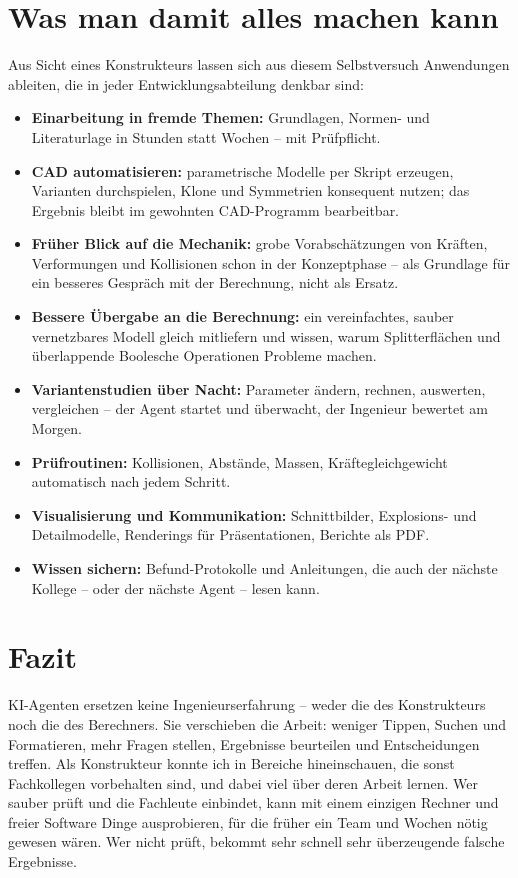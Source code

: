 \documentclass[10pt,a4paper]{article}
\begin{document}
\section{Was man damit alles machen kann}
Aus Sicht eines Konstrukteurs lassen sich aus diesem Selbstversuch Anwendungen ableiten, die in jeder
Entwicklungsabteilung denkbar sind:
\begin{itemize}[itemsep=1pt]
\item \textbf{Einarbeitung in fremde Themen:} Grundlagen, Normen- und Literaturlage in Stunden statt Wochen --
  mit Prüfpflicht.
\item \textbf{CAD automatisieren:} parametrische Modelle per Skript erzeugen, Varianten durchspielen, Klone und
  Symmetrien konsequent nutzen; das Ergebnis bleibt im gewohnten CAD-Programm bearbeitbar.
\item \textbf{Früher Blick auf die Mechanik:} grobe Vorabschätzungen von Kräften, Verformungen und Kollisionen
  schon in der Konzeptphase -- als Grundlage für ein besseres Gespräch mit der Berechnung, nicht als Ersatz.
\item \textbf{Bessere Übergabe an die Berechnung:} ein vereinfachtes, sauber vernetzbares Modell gleich mitliefern
  und wissen, warum Splitterflächen und überlappende Boolesche Operationen Probleme machen.
\item \textbf{Variantenstudien über Nacht:} Parameter ändern, rechnen, auswerten, vergleichen -- der Agent startet
  und überwacht, der Ingenieur bewertet am Morgen.
\item \textbf{Prüfroutinen:} Kollisionen, Abstände, Massen, Kräftegleichgewicht automatisch nach jedem Schritt.
\item \textbf{Visualisierung und Kommunikation:} Schnittbilder, Explosions- und Detailmodelle, Renderings für
  Präsentationen, Berichte als PDF.
\item \textbf{Wissen sichern:} Befund-Protokolle und Anleitungen, die auch der nächste Kollege -- oder der nächste
  Agent -- lesen kann.
\end{itemize}

\section*{Fazit}
KI-Agenten ersetzen keine Ingenieurserfahrung -- weder die des Konstrukteurs noch die des Berechners. Sie
verschieben die Arbeit: weniger Tippen, Suchen und Formatieren, mehr Fragen stellen, Ergebnisse beurteilen und
Entscheidungen treffen. Als Konstrukteur konnte ich in Bereiche hineinschauen, die sonst Fachkollegen vorbehalten
sind, und dabei viel über deren Arbeit lernen. Wer sauber prüft und die Fachleute einbindet, kann mit einem
einzigen Rechner und freier Software Dinge ausprobieren, für die früher ein Team und Wochen nötig gewesen wären.
Wer nicht prüft, bekommt sehr schnell sehr überzeugende falsche Ergebnisse.
\end{document}
